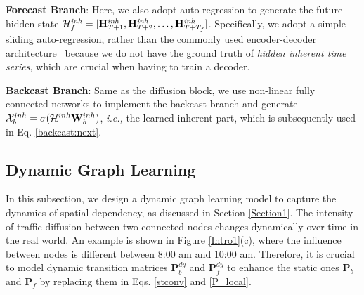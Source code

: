\documentclass[sigconf, nonacm]{acmart}
\def\b#1{\mathbf{#1}}
\def\cal#1{\mathcal{#1}}
\newcommand{\ie}{\textit{i.e.,}\xspace}
\begin{document}
\noindent\textbf{Forecast Branch}: Here, we also adopt auto-regression to generate the future hidden state ${\color{black}\cal{H}^{\mathit{\color{black}inh}}_f} = [\b{H}_{T+1}^{\mathit{\color{black}inh}},  \b{H}_{T+2}^{\mathit{\color{black}inh}}, \dots, \b{H}_{T+T_f}^{\mathit{\color{black}inh}}]$. 
Specifically, we adopt a simple sliding auto-regression, rather than the {\color{black}commonly used} encoder-decoder architecture~\cite{2014Seq2Seq, 2017Transformer} because we do not have the ground truth of {\color{black}\textit{hidden inherent time series}}, which are crucial when having to train a decoder.

\noindent\textbf{Backcast Branch}:
{\color{black}
Same as the {\color{black}diffusion} block, we use non-linear  fully connected networks to implement the backcast branch and generate $\mathcal{X}_b^{\color{black}inh}=\sigma(\cal{H}^{\color{black}inh}\b{W}_{b}^{\color{black}inh})$, \ie the learned {\color{black}inherent} part, which is subsequently used in Eq. \ref{backcast:next}.}
 \subsection{Dynamic Graph Learning}
{\color{black} In this subsection}, we design a dynamic graph learning model to {\color{black}capture the dynamics of spatial dependency, as discussed in Section \ref{Section1}}.
{\color{black} The intensity of traffic diffusion between two connected nodes changes dynamically over time in the real world.
An example is shown in Figure \ref{Intro1}(c), where the influence between nodes is different between 8:00 am and 10:00 am.}
Therefore, it is crucial to model dynamic transition {\color{black} matrices $\b{P}^{\mathit{dy}}_b$ and $\b{P}^{\mathit{dy}}_f$ to enhance the static ones $\b{P}_b$ and $\b{P}_f$ by replacing them in Eqs. \ref{stconv} and \ref{P_local}.} 
\end{document}

